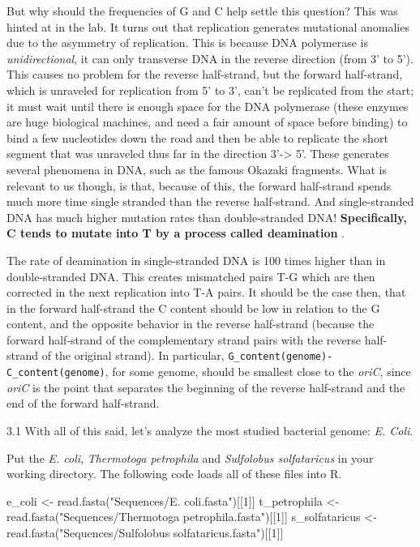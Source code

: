 \documentclass[
]{article}
\newenvironment{Shaded}{\begin{snugshade}}{\end{snugshade}}
\newcommand{\DecValTok}[1]{\textcolor[rgb]{0.00,0.00,0.81}{#1}}
\newcommand{\FunctionTok}[1]{\textcolor[rgb]{0.00,0.00,0.00}{#1}}
\newcommand{\NormalTok}[1]{#1}
\newcommand{\OtherTok}[1]{\textcolor[rgb]{0.56,0.35,0.01}{#1}}
\newcommand{\StringTok}[1]{\textcolor[rgb]{0.31,0.60,0.02}{#1}}
\begin{document}
But why should the frequencies of G and C help settle this question?
This was hinted at in the lab. It turns out that replication generates
mutational anomalies due to the asymmetry of replication. This is
because DNA polymerase is \emph{unidirectional}, it can only transverse
DNA in the reverse direction (from 3' to 5'). This causes no problem for
the reverse half-strand, but the forward half-strand, which is unraveled
for replication from 5' to 3', can't be replicated from the start; it
must wait until there is enough space for the DNA polymerase (these
enzymes are huge biological machines, and need a fair amount of space
before binding) to bind a few nucleotides down the road and then be able
to replicate the short segment that was unraveled thus far in the
direction 3'-\textgreater{} 5'. These generates several phenomena in
DNA, such as the famous Okazaki fragments. What is relevant to us
though, is that, because of this, the forward half-strand spends much
more time single stranded than the reverse half-strand. And
single-stranded DNA has much higher mutation rates than double-stranded
DNA! \textbf{Specifically, C tends to mutate into T by a process called
deamination} \span.

The rate of deamination in single-stranded DNA is 100 times higher than
in double-stranded DNA. This creates mismatched pairs T-G which are then
corrected in the next replication into T-A pairs. It should be the case
then, that in the forward half-strand the C content should be low in
relation to the G content, and the opposite behavior in the reverse
half-strand (because the forward half-strand of the complementary strand
pairs with the reverse half-strand of the original strand). In
particular, \texttt{G\_content(genome)-C\_content(genome)}, for some
genome, should be smallest close to the \emph{oriC}, since \emph{oriC}
is the point that separates the beginning of the reverse half-strand and
the end of the forward half-strand.

3.1 With all of this said, let's analyze the most studied bacterial
genome: \emph{E. Coli}. \span

Put the \emph{E. coli}, \emph{Thermotoga petrophila} and
\emph{Sulfolobus solfataricus} in your working directory. The following
code loads all of these files into R.

\begin{Shaded}
\begin{Highlighting}[]
\NormalTok{e\_coli }\OtherTok{\textless{}{-}} \FunctionTok{read.fasta}\NormalTok{(}\StringTok{"Sequences/E. coli.fasta"}\NormalTok{)[[}\DecValTok{1}\NormalTok{]]}
\NormalTok{t\_petrophila }\OtherTok{\textless{}{-}} \FunctionTok{read.fasta}\NormalTok{(}\StringTok{"Sequences/Thermotoga petrophila.fasta"}\NormalTok{)[[}\DecValTok{1}\NormalTok{]]}
\NormalTok{s\_solfataricus }\OtherTok{\textless{}{-}} \FunctionTok{read.fasta}\NormalTok{(}\StringTok{"Sequences/Sulfolobus solfataricus.fasta"}\NormalTok{)[[}\DecValTok{1}\NormalTok{]]}
\end{Highlighting}
\end{Shaded}
\end{document}
